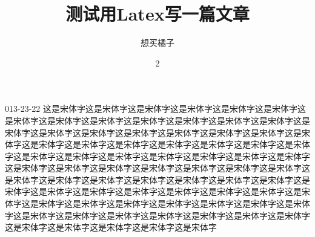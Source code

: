 \documentclass[36pt]{article}
\begin{document}
\begin{CJK}{UTF8}{simsun}
\title {测试用Latex写一篇文章}
\author {想买橘子}
\date 2013-23-22
这是宋体字这是宋体字这是宋体字这是宋体字这是宋体字这是宋体字这是宋体字这是宋体字这是宋体字这是宋体字这是宋体字这是宋体字这是宋体字这是宋体字这是宋体字这是宋体字这是宋体字这是宋体字这是宋体字这是宋体字这是宋体字这是宋体字这是宋体字这是宋体字这是宋体字这是宋体字这是宋体字这是宋体字这是宋体字这是宋体字这是宋体字这是宋体字这是宋体字这是宋体字这是宋体字这是宋体字这是宋体字这是宋体字这是宋体字这是宋体字这是宋体字这是宋体字这是宋体字这是宋体字这是宋体字这是宋体字这是宋体字这是宋体字这是宋体字这是宋体字这是宋体字这是宋体字这是宋体字这是宋体字这是宋体字这是宋体字这是宋体字这是宋体字这是宋体字这是宋体字这是宋体字这是宋体字这是宋体字这是宋体字这是宋体字这是宋体字这是宋体字这是宋体字这是宋体字这是宋体字这是宋体字这是宋体字这是宋体字这是宋体字这是宋体字这是宋体字
\end{CJK}
\end{document}
